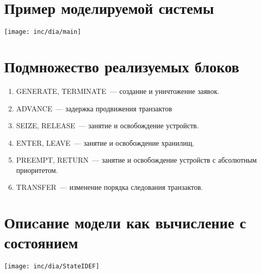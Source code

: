 \documentclass[12pt]{article}
\begin{document}




\section{Пример моделируемой системы}

\texttt{[image: inc/dia/main]}


\section{Подмножество реализуемых блоков}

\begin{enumerate}
\item GENERATE, TERMINATE~--- создание и уничтожение заявок.
\item ADVANCE~--- задержка продвижения транзактов
\item SEIZE, RELEASE~--- занятие и освобождение устройств.
\item ENTER, LEAVE~--- занятие и освобождение хранилищ.
\item PREEMPT, RETURN~--- занятие и освобождение устройств с абсолютным приоритетом.
\item TRANSFER~--- изменение порядка следования транзактов.
\end{enumerate}

\section{Опиcание модели как вычисление с состоянием}

\texttt{[image: inc/dia/StateIDEF]}
\end{document}
